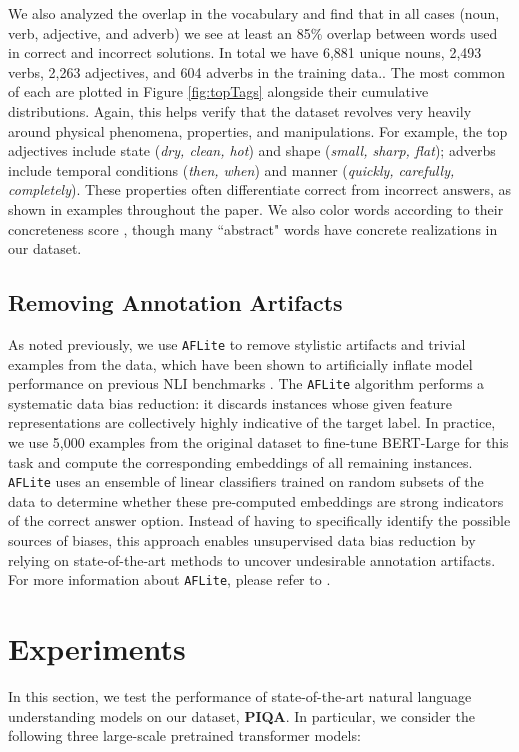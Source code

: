 We also analyzed the overlap in the vocabulary and find that in all cases (noun, verb, adjective, and adverb) we see at least an 85\% overlap between words used in correct and incorrect solutions.  In total we have 6,881 unique nouns, 2,493 verbs, 2,263 adjectives, and 604 adverbs in the training data..  The most common of each are plotted in Figure \ref{fig:topTags} alongside their cumulative distributions. Again, this helps verify that the dataset revolves very heavily around physical phenomena, properties, and manipulations.  For example, the top adjectives include state (\textit{dry, clean, hot}) and shape (\textit{small, sharp, flat}); adverbs include temporal conditions (\textit{then, when}) and manner (\textit{quickly, carefully, completely}). These properties often differentiate correct from incorrect answers, as shown in examples throughout the paper. We also color words according to their concreteness score \cite{concrete}, though many ``abstract" words have  concrete realizations in our dataset.

\subsection{Removing Annotation Artifacts}

As noted previously, we use \texttt{AFLite} \cite{Sakaguchi2019WINOGRANDEAA} to remove stylistic artifacts and trivial examples from the data, which have been shown to artificially inflate model performance on previous NLI benchmarks \cite{hypothesis-only-baselines-in-natural-language-inference,gururangan-etal-2018-annotation}. The \texttt{AFLite} algorithm performs a systematic data bias reduction: it discards instances whose given feature representations are collectively highly indicative of the target label. In practice, we use 5,000 examples from the original dataset to fine-tune BERT-Large for this task and compute the corresponding embeddings of all remaining instances. \texttt{AFLite} uses an ensemble of linear classifiers trained on random subsets of the data to determine whether these pre-computed embeddings are strong indicators of the correct answer option. Instead of having to specifically identify the possible sources of biases, this approach enables unsupervised data bias reduction by relying on state-of-the-art methods to uncover undesirable annotation artifacts. For more information about \texttt{AFLite}, please refer to \cite{Sakaguchi2019WINOGRANDEAA}.

\section{Experiments}
In this section, we test the performance of state-of-the-art natural language understanding models on our dataset, \textbf{PIQA}. In particular, we consider the following three large-scale pretrained transformer models:

